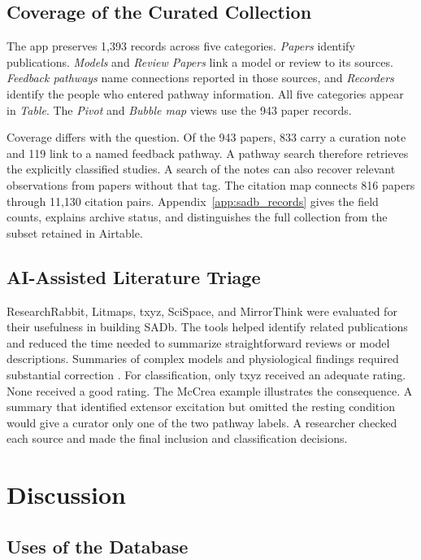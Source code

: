 \subsection{Coverage of the Curated Collection}\label{sec:sadb_coverage}

The app preserves 1,393 records across five categories. \emph{Papers} identify publications. \emph{Models} and \emph{Review Papers} link a model or review to its sources. \emph{Feedback pathways} name connections reported in those sources, and \emph{Recorders} identify the people who entered pathway information. All five categories appear in \emph{Table}. The \emph{Pivot} and \emph{Bubble map} views use the 943 paper records.

Coverage differs with the question. Of the 943 papers, 833 carry a curation note and 119 link to a named feedback pathway. A pathway search therefore retrieves the explicitly classified studies. A search of the notes can also recover relevant observations from papers without that tag. The citation map connects 816 papers through 11,130 citation pairs. Appendix~\ref{app:sadb_records} gives the field counts, explains archive status, and distinguishes the full collection from the subset retained in Airtable.

\subsection{AI-Assisted Literature Triage}\label{sec:sadb_triage}

ResearchRabbit, Litmaps, txyz, SciSpace, and MirrorThink were evaluated for their usefulness in building SADb. The tools helped identify related publications and reduced the time needed to summarize straightforward reviews or model descriptions. Summaries of complex models and physiological findings required substantial correction \citep{bolen_using_2024}. For classification, only txyz received an adequate rating. None received a good rating. The McCrea example illustrates the consequence. A summary that identified extensor excitation but omitted the resting condition would give a curator only one of the two pathway labels. A researcher checked each source and made the final inclusion and classification decisions.

\section{Discussion}
\subsection{Uses of the Database}\label{sec:sadb_use}

